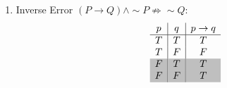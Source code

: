 \begin{enumerate}
\noindent
	\item Inverse Error \((P\rightarrow Q) \wedge \sim P \not\Rightarrow \sim Q\):
\[ 
	\begin{array}{c|c|c}
			p & q & p\rightarrow q \\ \hline 
			T & T & T\\ 
			T & F & F\\
			\rowcolor{gray!50!white} F & T & T\\
			\rowcolor{gray!50!white} F & F & T\\
	\end{array}
\]
\end{enumerate}